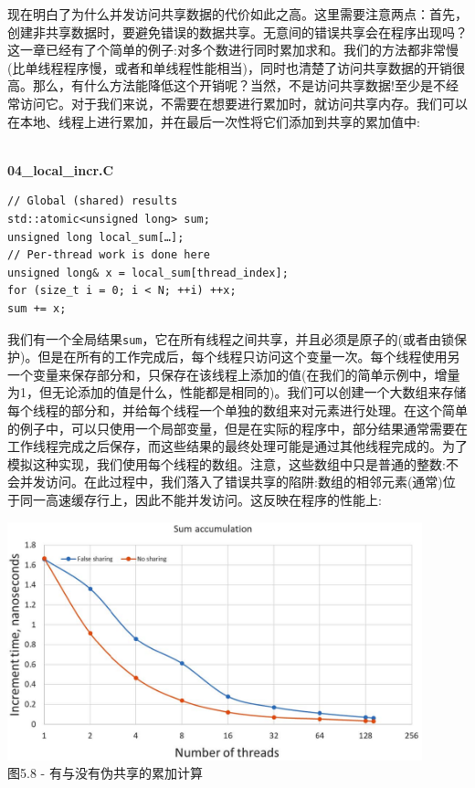 现在明白了为什么并发访问共享数据的代价如此之高。这里需要注意两点：首先，创建非共享数据时，要避免错误的数据共享。无意间的错误共享会在程序出现吗？这一章已经有了个简单的例子:对多个数进行同时累加求和。我们的方法都非常慢(比单线程程序慢，或者和单线程性能相当)，同时也清楚了访问共享数据的开销很高。那么，有什么方法能降低这个开销呢？当然，不是访问共享数据!至少是不经常访问它。对于我们来说，不需要在想要进行累加时，就访问共享内存。我们可以在本地、线程上进行累加，并在最后一次性将它们添加到共享的累加值中:

\hspace*{\fill} \\ %
\noindent
\textbf{04\_local\_incr.C}
\begin{lstlisting}[style=styleCXX]
// Global (shared) results
std::atomic<unsigned long> sum;
unsigned long local_sum[…];
// Per-thread work is done here
unsigned long& x = local_sum[thread_index];
for (size_t i = 0; i < N; ++i) ++x;
sum += x;
\end{lstlisting}

我们有一个全局结果\texttt{sum}，它在所有线程之间共享，并且必须是原子的(或者由锁保护)。但是在所有的工作完成后，每个线程只访问这个变量一次。每个线程使用另一个变量来保存部分和，只保存在该线程上添加的值(在我们的简单示例中，增量为1，但无论添加的值是什么，性能都是相同的)。我们可以创建一个大数组来存储每个线程的部分和，并给每个线程一个单独的数组来对元素进行处理。在这个简单的例子中，可以只使用一个局部变量，但是在实际的程序中，部分结果通常需要在工作线程完成之后保存，而这些结果的最终处理可能是通过其他线程完成的。为了模拟这种实现，我们使用每个线程的数组。注意，这些数组中只是普通的整数:不会并发访问。在此过程中，我们落入了错误共享的陷阱:数组的相邻元素(通常)位于同一高速缓存行上，因此不能并发访问。这反映在程序的性能上:

\begin{center}
\includegraphics[width=0.9\textwidth]{content/1/chapter5/images/8.jpg}\\
图5.8 - 有与没有伪共享的累加计算
\end{center}

